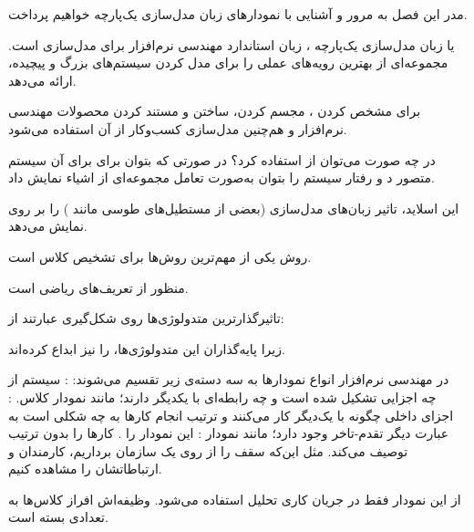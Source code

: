 
مدر این فصل به مرور و آشنایی با نمودارهای زبان مدل‌سازی یک‌پارچه خواهیم پرداخت.





 یا زبان مدل‌سازی یک‌پارچه ، زبان استاندارد مهندسی نرم‌افزار برای مدل‌سازی است. مجموعه‌ای از بهترین رویه‌های عملی  را برای مدل کردن سیستم‌های بزرگ و پیچیده، ارائه می‌دهد.

 برای مشخص کردن ،  مجسم کردن، ساختن  و مستند کردن  محصولات  مهندسی نرم‌افزار و هم‌چنین مدل‌سازی کسب‌وکار از آن استفاده می‌شود.

 در چه صورت می‌توان از  استفاده کرد؟ در صورتی که بتوان برای برای آن سیستم  متصور د و رفتار سیستم را بتوان به‌صورت تعامل مجموعه‌ای از اشیاء نمایش داد. 

 این اسلاید، تاثیر زبان‌های مدل‌سازی (بعضی از مستطیل‌های طوسی مانند ) را بر روی  نمایش می‌دهد. 

 روش   یکی از مهم‌ترین روش‌ها برای تشخیص کلاس است. 

 منظور از  تعریف‌های ریاضی است.

 تاثیرگذارترین متدولوژی‌ها روی شکل‌گیری  عبارتند از: 
 
 
 

زیرا پایه‌گذاران این متدولوژی‌ها،  را نیز ابداع کرده‌اند.


در مهندسی نرم‌افزار انواع نمودارها به سه دسته‌ی زیر تقسیم می‌شوند:
 : سیستم از چه اجزایی تشکیل شده است و چه رابطه‌ای با یکدیگر دارند؛ مانند نمودار کلاس. 
 : اجزای داخلی چگونه با یک‌دیگر کار می‌کنند و ترتیب انجام کارها به چه شکلی است به عبارت دیگر تقدم-تاخر وجود دارد؛ مانند نمودار 
 :  این نمودار را . کارها را بدون ترتیب توصیف می‌کند. مثل این‌که سقف را از روی یک سازمان برداریم، کارمندان و ارتباطاتشان را مشاهده کنیم.

 از این نمودار فقط در جریان کاری تحلیل استفاده می‌شود. وظیفه‌اش افراز  کلاس‌ها به تعدادی بسته است.

